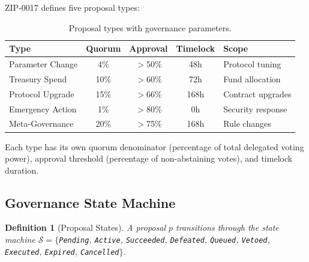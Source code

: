 \documentclass[11pt,letterpaper]{article}
\newtheorem{definition}{Definition}[section]
\begin{document}
ZIP-0017 defines five proposal types:

\begin{table}[h]
\centering
\caption{Proposal types with governance parameters.}
\label{tab:types}
\begin{tabular}{lcccl}
\toprule
\textbf{Type} & \textbf{Quorum} & \textbf{Approval} & \textbf{Timelock} & \textbf{Scope} \\
\midrule
Parameter Change & 4\% & $>$50\% & 48h & Protocol tuning \\
Treasury Spend & 10\% & $>$60\% & 72h & Fund allocation \\
Protocol Upgrade & 15\% & $>$66\% & 168h & Contract upgrades \\
Emergency Action & 1\% & $>$80\% & 0h & Security response \\
Meta-Governance & 20\% & $>$75\% & 168h & Rule changes \\
\bottomrule
\end{tabular}
\end{table}

Each type has its own quorum denominator (percentage of total delegated voting power), approval threshold (percentage of non-abstaining votes), and timelock duration.

\subsection{Governance State Machine}

\begin{definition}[Proposal States]
A proposal $p$ transitions through the state machine $\mathcal{S} = \{$\texttt{Pending}, \texttt{Active}, \texttt{Succeeded}, \texttt{Defeated}, \texttt{Queued}, \texttt{Vetoed}, \texttt{Executed}, \texttt{Expired}, \texttt{Cancelled}$\}$.
\end{definition}
\end{document}
